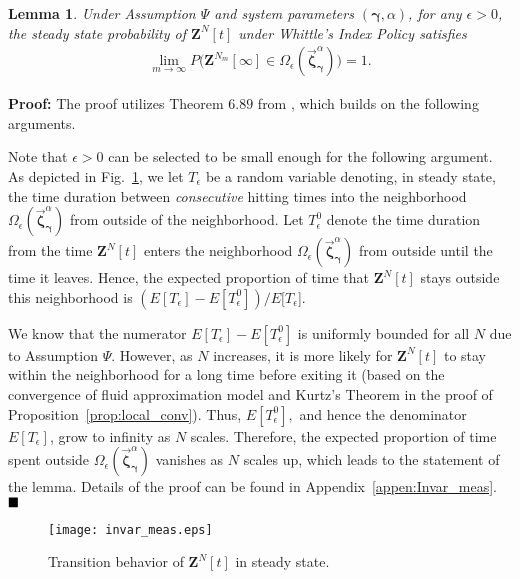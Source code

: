 \documentclass[11pt,twocolumn]{IEEEtran}
\newtheorem{lemma}{Lemma}
\begin{document}
\vspace{-2pt}
\begin{lemma}
\label{lemma:steady_dist} Under Assumption $\Psi$ and system
parameters $(\bm \gamma, \alpha)$, for any $\epsilon>0$, the steady
state probability of ${\bm Z}^N[t]$ under Whittle's Index Policy
satisfies
\vspace{-3pt}
\begin{align}
\lim_{m \rightarrow \infty} P\big({\bm Z}^{N_m}[\infty] \in
\Omega_{\epsilon}(\vec{\bm \zeta}^{\alpha}_{\bm \gamma})\big)=1.
\nonumber
\end{align}
\end{lemma}

\vspace{-2pt}
\noindent \textbf{Proof:} The proof utilizes Theorem $6.89$ from
\cite{Weiss_LD}, which builds on the following arguments.

Note that $\epsilon>0$ can be selected to be small enough for the
following argument. As depicted in Fig.~\ref{fig:invar_meas}, we let
$T_{\epsilon}$ be a random variable denoting, in steady state, the
time duration between \emph{consecutive} hitting times into the
neighborhood $\Omega_{\epsilon}(\vec{\bm \zeta}^{\alpha}_{\bm
\gamma})$ from outside of the neighborhood. Let $T^0_{\epsilon}$
denote the time duration from the time ${\bm Z}^N[t]$ enters the
neighborhood $\Omega_{\epsilon}(\vec{\bm \zeta}^{\alpha}_{\bm
\gamma})$ from outside until the time it leaves. Hence, the
expected proportion of time that ${\bm Z}^N[t]$ stays outside this
neighborhood is
$(E[T_{\epsilon}]-E[T^0_{\epsilon}])/E[T_{\epsilon}$].

We know that the numerator $E[T_{\epsilon}]-E[T^0_{\epsilon}]$ is uniformly
bounded for all $N$ due to Assumption $\Psi$. However, as $N$
increases, it is more likely for ${\bm Z}^N[t]$ to stay within the
neighborhood for a long time before exiting it (based on the convergence of fluid approximation model and Kurtz's Theorem in the proof of Proposition~\ref{prop:local_conv}). Thus,
$E[T^0_{\epsilon}],$ and hence the denominator $E[T_{\epsilon}]$, grow to infinity
as $N$ scales. Therefore, the expected proportion of time spent
outside $\Omega_{\epsilon}(\vec{\bm \zeta}^{\alpha}_{\bm \gamma})$
vanishes as $N$ scales up, which leads to the statement of the
lemma. Details of the proof can be found in Appendix~\ref{appen:Invar_meas}. $\hfill \blacksquare$

\begin{figure}
\centering
\texttt{[image: invar\_meas.eps]}
\vspace{-8pt}
\caption{Transition behavior of ${\bm Z}^N[t]$ in steady state.}
\label{fig:invar_meas}
\vspace{-12pt}
\end{figure}
\end{document}
